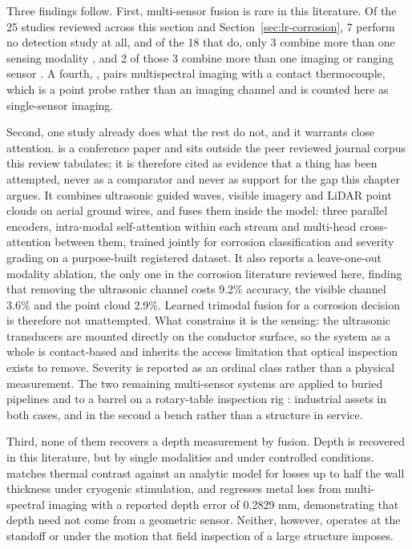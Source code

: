 Three findings follow. First, multi-sensor fusion is rare in this literature.
Of the 25 studies reviewed across this section and
Section~\ref{sec:lr-corrosion}, 7 perform no detection study at all, and of the
18 that do, only 3 combine more than one sensing modality
\citep{Huang2026a,Ding2025,Haitz2022}, and 2 of those 3
combine more than one imaging or ranging sensor
\citep{Ding2025,Haitz2022}. A fourth,
\citet{Egodawela2025}, pairs multispectral imaging with a contact thermocouple,
which is a point probe rather than an imaging channel and is counted here as
single-sensor imaging.

Second, one study already does what the rest do not, and it warrants close
attention. \citet{Ding2025} is a conference paper and sits outside the peer
reviewed journal corpus this review tabulates; it is therefore cited as evidence
that a thing has been attempted, never as a comparator and never as support for
the gap this chapter argues. It combines ultrasonic guided waves,
visible imagery and LiDAR point clouds on aerial ground wires, and fuses them
inside the model: three parallel encoders, intra-modal self-attention within each
stream and multi-head cross-attention between them, trained jointly for corrosion
classification and severity grading on a purpose-built registered dataset. It
also reports a leave-one-out modality ablation, the only one in the corrosion
literature reviewed here, finding that removing the ultrasonic channel costs
9.2\% accuracy, the visible channel 3.6\% and the point cloud 2.9\%. Learned
trimodal fusion for a corrosion decision is therefore not unattempted. What
constrains it is the sensing: the ultrasonic transducers are mounted directly on
the conductor surface, so the system as a whole is contact-based and inherits
the access limitation that optical inspection exists to remove. Severity is
reported as an ordinal class rather than a physical measurement. The two
remaining multi-sensor systems are applied to buried pipelines
\citep{Huang2026a} and to a barrel on a rotary-table inspection rig
\citep{Haitz2022}: industrial assets in both cases, and in the second a bench
rather than a structure in service.

Third, none of them recovers a depth measurement by fusion. Depth is recovered
in this literature, but by single modalities and under controlled conditions.
\citet{Doshvarpassand2022} matches thermal contrast against an analytic model for
losses up to half the wall thickness under cryogenic stimulation, and \citet{Egodawela2025} regresses metal
loss from multi-spectral imaging with a reported depth error of 0.2829 mm,
demonstrating that depth need not come from a geometric sensor. Neither, however, operates at the standoff or under
the motion that field inspection of a large structure imposes.

